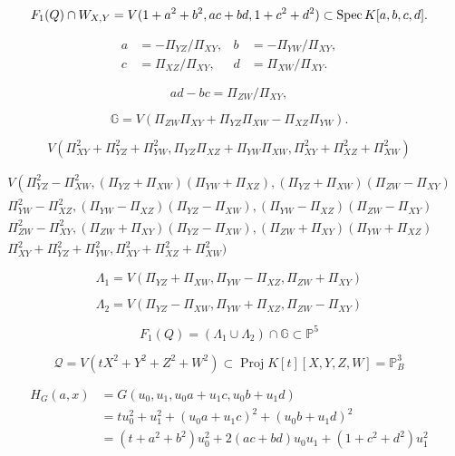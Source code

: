 \[
	F_1(Q)\cap W_{X,Y}=V(1+a^2+b^2,ac+bd,1+c^2+d^2)\subset \operatorname{Spec} K[a,b,c,d].
\]


\[
	\begin{aligned}
		a&=-\Pi_{YZ}/\Pi_{XY},&b&=-\Pi_{YW}/\Pi_{XY},\\
		c&=\Pi_{XZ}/\Pi_{XY},&d&=\Pi_{XW}/\Pi_{XY}.
	\end{aligned}
\]

\[
	ad-bc=\Pi_{ZW}/\Pi_{XY},
\]

\[
	\mathbb G=V(\Pi_{ZW}\Pi_{XY}+\Pi_{YZ}\Pi_{XW}-\Pi_{XZ}\Pi_{YW}).
\]

\[
	V(\Pi_{XY}^2+\Pi_{YZ}^2+\Pi_{YW}^2,\Pi_{YZ}\Pi_{XZ}+\Pi_{YW}\Pi_{XW},\Pi_{XY}^2+\Pi_{XZ}^2+\Pi_{XW}^2)
\]

\[
\begin{array}{l}{V\left(\Pi_{Y Z}^{2}-\Pi_{X W}^{2},\left(\Pi_{Y Z}+\Pi_{X W}\right)\left(\Pi_{Y W}+\Pi_{X Z}\right),\left(\Pi_{Y Z}+\Pi_{X W}\right)\left(\Pi_{Z W}-\Pi_{X Y}\right)\right.} \\ {\Pi_{Y W}^{2}-\Pi_{X Z}^{2},\left(\Pi_{Y W}-\Pi_{X Z}\right)\left(\Pi_{Y Z}-\Pi_{X W}\right),\left(\Pi_{Y W}-\Pi_{X Z}\right)\left(\Pi_{Z W}-\Pi_{X Y}\right)} \\ {\Pi_{Z W}^{2}-\Pi_{X Y}^{2},\left(\Pi_{Z W}+\Pi_{X Y}\right)\left(\Pi_{Y Z}-\Pi_{X W}\right),\left(\Pi_{Z W}+\Pi_{X Y}\right)\left(\Pi_{Y W}+\Pi_{X Z}\right)} \\ {\Pi_{X Y}^{2}+\Pi_{Y Z}^{2}+\Pi_{Y W}^{2}, \Pi_{X Y}^{2}+\Pi_{X Z}^{2}+\Pi_{X W}^{2} )}\end{array}
\]

\[
	\Lambda_{1}=V\left(\Pi_{Y Z}+\Pi_{X W}, \Pi_{Y W}-\Pi_{X Z}, \Pi_{Z W}+\Pi_{X Y}\right)
\]

\[
	\Lambda_{2}=V\left(\Pi_{Y Z}-\Pi_{X W}, \Pi_{Y W}+\Pi_{X Z}, \Pi_{Z W}-\Pi_{X Y}\right)
\]

\[
	F_{1}(Q)=\left(\Lambda_{1} \cup \Lambda_{2}\right) \cap \mathbb{G} \subset \mathbb{P}^{5}
\]


\[
	\mathscr{Q}=V\left(t X^{2}+Y^{2}+Z^{2}+W^{2}\right) \subset \operatorname{Proj} K[t][X, Y, Z, W]=\mathbb{P}_{B}^{3}
\]

\[
\begin{aligned} H_{G}(a, x) &=G\left(u_{0}, u_{1}, u_{0} a+u_{1} c, u_{0} b+u_{1} d\right) \\ &=t u_{0}^{2}+u_{1}^{2}+\left(u_{0} a+u_{1} c\right)^{2}+\left(u_{0} b+u_{1} d\right)^{2} \\ &=\left(t+a^{2}+b^{2}\right) u_{0}^{2}+2(a c+b d) u_{0} u_{1}+\left(1+c^{2}+d^{2}\right) u_{1}^{2} \end{aligned}
\]

